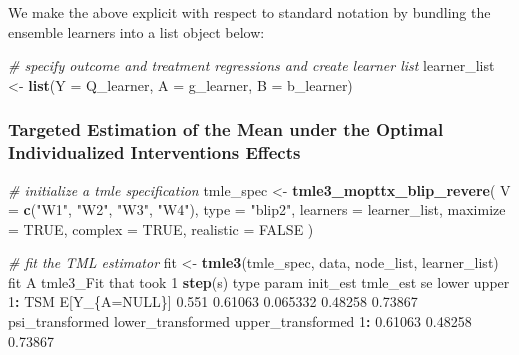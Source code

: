 \documentclass[12pt, krantz2,]{krantz}
\newenvironment{Shaded}{\begin{snugshade}}{\end{snugshade}}
\newcommand{\CommentTok}[1]{\textcolor[rgb]{0.37,0.37,0.37}{\textit{#1}}}
\newcommand{\DataTypeTok}[1]{\textcolor[rgb]{0.27,0.27,0.27}{#1}}
\newcommand{\DecValTok}[1]{\textcolor[rgb]{0.06,0.06,0.06}{#1}}
\newcommand{\FloatTok}[1]{\textcolor[rgb]{0.06,0.06,0.06}{#1}}
\newcommand{\KeywordTok}[1]{\textcolor[rgb]{0.27,0.27,0.27}{\textbf{#1}}}
\newcommand{\NormalTok}[1]{#1}
\newcommand{\OperatorTok}[1]{\textcolor[rgb]{0.43,0.43,0.43}{\textbf{#1}}}
\newcommand{\OtherTok}[1]{\textcolor[rgb]{0.37,0.37,0.37}{#1}}
\newcommand{\StringTok}[1]{\textcolor[rgb]{0.5,0.5,0.5}{#1}}
\theoremstyle{definition}
\theoremstyle{definition}
\theoremstyle{definition}
\newcommand{\1}{\mathbbm{1}}
\begin{document}
We make the above explicit with respect to standard notation by bundling the
ensemble learners into a list object below:

\begin{Shaded}
\begin{Highlighting}[]
\CommentTok{# specify outcome and treatment regressions and create learner list}
\NormalTok{learner_list <-}\StringTok{ }\KeywordTok{list}\NormalTok{(}\DataTypeTok{Y =}\NormalTok{ Q_learner, }\DataTypeTok{A =}\NormalTok{ g_learner, }\DataTypeTok{B =}\NormalTok{ b_learner)}
\end{Highlighting}
\end{Shaded}

\hypertarget{targeted-estimation-of-the-mean-under-the-optimal-individualized-interventions-effects-1}{%
\subsubsection{Targeted Estimation of the Mean under the Optimal Individualized Interventions Effects}\label{targeted-estimation-of-the-mean-under-the-optimal-individualized-interventions-effects-1}}

\begin{Shaded}
\begin{Highlighting}[]
\CommentTok{# initialize a tmle specification}
\NormalTok{tmle_spec <-}\StringTok{ }\KeywordTok{tmle3_mopttx_blip_revere}\NormalTok{(}
  \DataTypeTok{V =} \KeywordTok{c}\NormalTok{(}\StringTok{"W1"}\NormalTok{, }\StringTok{"W2"}\NormalTok{, }\StringTok{"W3"}\NormalTok{, }\StringTok{"W4"}\NormalTok{), }\DataTypeTok{type =} \StringTok{"blip2"}\NormalTok{,}
  \DataTypeTok{learners =}\NormalTok{ learner_list, }\DataTypeTok{maximize =} \OtherTok{TRUE}\NormalTok{, }\DataTypeTok{complex =} \OtherTok{TRUE}\NormalTok{,}
  \DataTypeTok{realistic =} \OtherTok{FALSE}
\NormalTok{)}
\end{Highlighting}
\end{Shaded}

\begin{Shaded}
\begin{Highlighting}[]
\CommentTok{# fit the TML estimator}
\NormalTok{fit <-}\StringTok{ }\KeywordTok{tmle3}\NormalTok{(tmle_spec, data, node_list, learner_list)}
\NormalTok{fit}
\NormalTok{A tmle3_Fit that took }\DecValTok{1} \KeywordTok{step}\NormalTok{(s)}
\NormalTok{   type         param init_est tmle_est       se   lower   upper}
\DecValTok{1}\OperatorTok{:}\StringTok{  }\NormalTok{TSM E[Y_\{A=}\OtherTok{NULL}\NormalTok{\}]    }\FloatTok{0.551}  \FloatTok{0.61063} \FloatTok{0.065332} \FloatTok{0.48258} \FloatTok{0.73867}
\NormalTok{   psi_transformed lower_transformed upper_transformed}
\DecValTok{1}\OperatorTok{:}\StringTok{         }\FloatTok{0.61063}           \FloatTok{0.48258}           \FloatTok{0.73867}
\end{Highlighting}
\end{Shaded}
\end{document}
